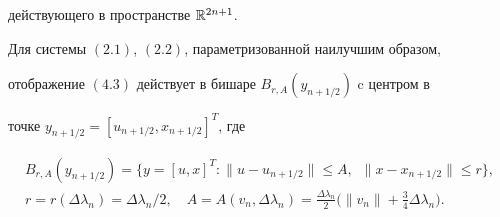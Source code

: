 действующего в пространстве $\Bbb R^{2n+1}$. 


 





\begin{lemnonum} 


Для системы $(2.1)$, $(2.2)$, параметризованной наилучшим образом, 


отображение $(4.3)$ действует в бишаре $B_{r,A}(y_{n+1/2})$ c центром в 


точке $y_{n+1/2}=[u_{n+1/2},x_{n+1/2}]^T$, где 


\begin{gather} 


B_{r,A}(y_{n+1/2})=\{y=[u,x]^T:\|u-u_{n+1/2}\|\le A, 


\ \; \|x-x_{n+1/2}\|\le r\},\\ 


r=r(\Delta\lambda_n)=\Delta\lambda_n/2,\quad 


A=A(v_n,\Delta\lambda_n)=\frac{\Delta\lambda_n}{2}\bigg(\|v_n\|+ 


\frac{3}{4}\Delta\lambda_n\bigg). 


\end{gather} 


\end{lemnonum} 


 


